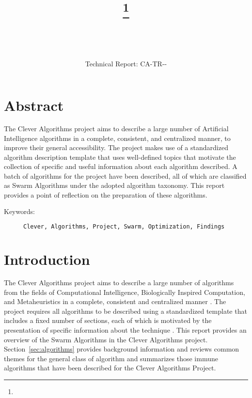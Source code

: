 \documentclass[a4paper, 11pt]{article}
\title{{\myreporttitle}\footnote{\myreportlicense}}
\author{\myreportauthor\\{\myreportemail}\\\small\myreportproject}
\date{\myreportfulldate\\{\small{Technical Report: CA-TR-{\myreportdate}-\myreportversion}}}
\begin{document}
\maketitle

\section*{Abstract} 
The Clever Algorithms project aims to describe a large number of Artificial Intelligence algorithms in a complete, consistent, and centralized manner, to improve their general accessibility. 
The project makes use of a standardized algorithm description template that uses well-defined topics that motivate the collection of specific and useful information about each algorithm described.
A batch of algorithms for the project have been described, all of which are classified as Swarm Algorithms under the adopted algorithm taxonomy.
This report provides a point of reflection on the preparation of these algorithms.

\begin{description}
	\item[Keywords:] {\small\texttt{Clever, Algorithms, Project, Swarm, Optimization, Findings}}
\end{description} 

\section{Introduction}
\label{sec:introduction}
The Clever Algorithms project aims to describe a large number of algorithms from the fields of Computational Intelligence, Biologically Inspired Computation, and Metaheuristics in a complete, consistent and centralized manner \cite{Brownlee2010}.
The project requires all algorithms to be described using a standardized template that includes a fixed number of sections, each of which is motivated by the presentation of specific information about the technique \cite{Brownlee2010a}.
This report provides an overview of the Swarm Algorithms in the Clever Algorithms project. 
Section~\ref{sec:algorithms} provides background information and reviews common themes for the general class of algorithm and summarizes those immune algorithms that have been described for the Clever Algorithms Project.

% 
% 
\end{document}
